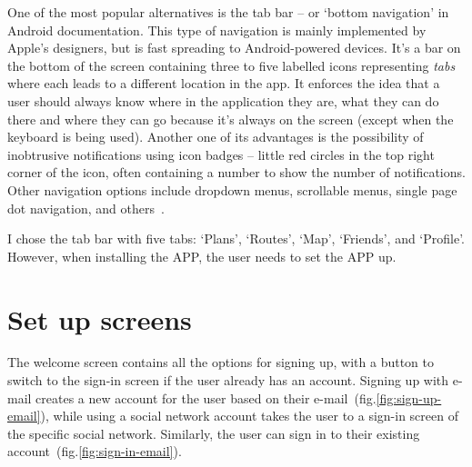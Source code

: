One of the most popular alternatives is the tab bar -- or `bottom navigation' in Android documentation.
This type of navigation is mainly implemented by Apple's designers, but is fast spreading to Android-powered devices.
It's a bar on the bottom of the screen containing three to five labelled icons representing \textit{tabs} where each leads to a different location in the app.
It enforces the idea that a user should always know where in the application they are, what they can do there and where they can go because it's always on the screen (except when the keyboard is being used).
Another one of its advantages is the possibility of inobtrusive notifications using icon badges -- little red circles in the top right corner of the icon, often containing a number to show the number of notifications.
Other navigation options include dropdown menus, scrollable menus, single page dot navigation, and others~\cite{hamburger-alternatives}.

I chose the tab bar with five tabs: `Plans', `Routes', `Map', `Friends', and `Profile'.
However, when installing the APP, the user needs to set the APP up.

\section{Set up screens}
The welcome screen contains all the options for signing up, with a button to switch to the sign-in screen if the user already has an account.
Signing up with e-mail creates a new account for the user based on their e-mail~(fig.\ref{fig:sign-up-email}), while using a social network account takes the user to a sign-in screen of the specific social network.
Similarly, the user can sign in to their existing account~(fig.\ref{fig:sign-in-email}).

